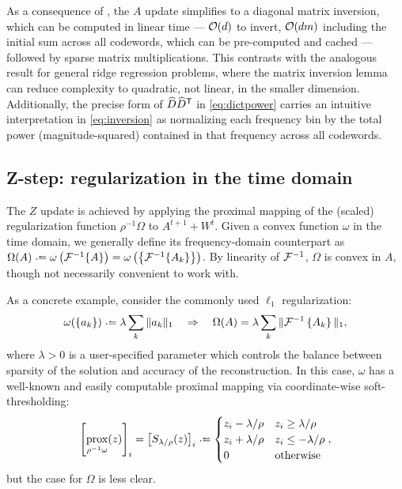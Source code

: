 \documentclass{article} %
\begin{document}
As a consequence of , the $A$ update simplifies to a diagonal matrix
inversion, which can be computed in linear time --- $\mathcal{O}(d)$ to invert, $\mathcal{O}(dm)$
including the initial sum across all codewords, which can be pre-computed and 
cached --- followed by sparse matrix multiplications.
This contrasts with the analogous result for general ridge regression problems, where the 
matrix inversion lemma can reduce complexity to quadratic, not linear, in the smaller 
dimension. 
Additionally, the precise form of $\widehat{D}\widehat{D}^\mathsf{T}$ in \eqref{eq:dictpower} 
carries an intuitive interpretation in \eqref{eq:inversion} as normalizing each frequency 
bin by the total power (magnitude-squared) contained in that frequency across all 
codewords.


\subsection{Z-step: regularization in the time domain}
\label{sec:zstep}
The $Z$ update is achieved by applying the proximal mapping of the (scaled) 
regularization function $\rho^{-1}\Omega$ to $A^{t+1} + W^t$.  
Given a convex function $\omega$ in the time domain, we generally define its
frequency-domain counterpart as 
$\Omega(A) \defeq \omega\left(\F^{-1}\{A\}\right) = \omega\left(\left\{\F^{-1}\{A_k\}\right\}\right)$.  By linearity of
$\mathcal{F}^{-1}$, $\Omega$ is convex in $A$, though not necessarily convenient to work with.

As a concrete example, consider the commonly used $\ell_1$ regularization:
\[
\omega(\{a_k\}) \defeq \lambda \sum_k \|a_k\|_1
\quad \Rightarrow \quad
\Omega(A) = \lambda \sum_k \| \F^{-1} \left\{ A_k \right\} \|_1,
\]
where $\lambda>0$ is a user-specified parameter which controls the balance between
sparsity of the solution and accuracy of the reconstruction.  In this case, $\omega$ has a
well-known and easily computable proximal mapping via coordinate-wise soft-thresholding:
\[
{\left[\prox_{\rho^{-1} \omega}(z)\right]}_i = {\left[S_{\lambda/\rho}(z)\right]}_i \defeq \begin{cases}
z_i - \lambda / \rho & z_i \geq \lambda / \rho\\
z_i + \lambda / \rho & z_i \leq -\lambda / \rho\\
0 & \text{otherwise}
\end{cases},
\]
but the case for $\Omega$ is less clear.
\end{document}
